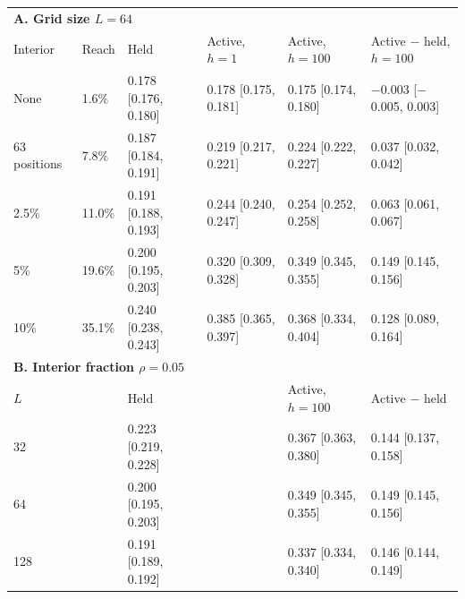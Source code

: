 \begin{center}
\begin{minipage}{\linewidth}\centering
\captionsetup{type=table,hypcap=false}
\caption{Technical traders inside the grid, with revision probability $r=1$. In addition to the technical traders along the edge, band-rule technical traders occupied a fraction $\rho$ of interior positions, excluding the traders given the new rule; the row of 63 positions adds as many interior technical traders as there are along the edge. Reach is the mean fraction of the other interior traders with at least one technical trader among their four neighbors. Entries are interpolated $f_{50}$ over 50 starting markets and 3,000 post-switch steps, with 95\% intervals in brackets from 2,000 bootstrap samples of whole starting markets shared by all conditions; active $-$ held is the difference in $f_{50}$ at dealer depth $h=100$. Panel B uses interior fraction $\rho=0.05$. At grid size $L=128$ with technical traders held, majority probability rose steeply enough that only three tested fractions had probabilities strictly between 0.05 and 0.95. No no-switch control reached a Sell majority in any condition.}
\label{tab:variants-placement}
\scriptsize\setlength{\tabcolsep}{2.5pt}
\begin{tabular}{llllll}
\toprule
\multicolumn{6}{l}{\textbf{A. Grid size $L=64$}} \\
Interior & Reach & Held & Active, $h=1$ & Active, $h=100$ & Active $-$ held, $h=100$ \\
\midrule
None & 1.6\% & 0.178 [0.176, 0.180] & 0.178 [0.175, 0.181] & 0.175 [0.174, 0.180] & $-$0.003 [$-$0.005, 0.003] \\
63 positions & 7.8\% & 0.187 [0.184, 0.191] & 0.219 [0.217, 0.221] & 0.224 [0.222, 0.227] & 0.037 [0.032, 0.042] \\
2.5\% & 11.0\% & 0.191 [0.188, 0.193] & 0.244 [0.240, 0.247] & 0.254 [0.252, 0.258] & 0.063 [0.061, 0.067] \\
5\% & 19.6\% & 0.200 [0.195, 0.203] & 0.320 [0.309, 0.328] & 0.349 [0.345, 0.355] & 0.149 [0.145, 0.156] \\
10\% & 35.1\% & 0.240 [0.238, 0.243] & 0.385 [0.365, 0.397] & 0.368 [0.334, 0.404] & 0.128 [0.089, 0.164] \\
\midrule
\multicolumn{6}{l}{\textbf{B. Interior fraction $\rho=0.05$}} \\
$L$ & & Held & & Active, $h=100$ & Active $-$ held \\
\midrule
32 &  & 0.223 [0.219, 0.228] &  & 0.367 [0.363, 0.380] & 0.144 [0.137, 0.158] \\
64 &  & 0.200 [0.195, 0.203] &  & 0.349 [0.345, 0.355] & 0.149 [0.145, 0.156] \\
128 &  & 0.191 [0.189, 0.192] &  & 0.337 [0.334, 0.340] & 0.146 [0.144, 0.149] \\
\bottomrule
\end{tabular}
\end{minipage}
\end{center}
